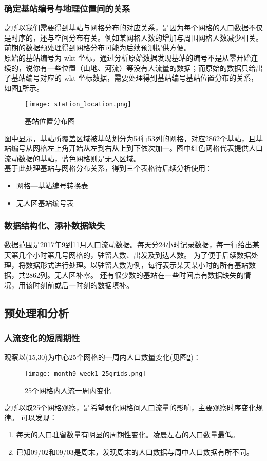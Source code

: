 \subsubsection*{确定基站编号与地理位置间的关系}
之所以我们需要得到基站与网格分布的对应关系，是因为每个网格的人口数据不仅是时序的，还与空间分布有关。例如某网格人数的增加与周围网格人数减少相关。前期的数据预处理得到网格分布可能为后续预测提供方便。\\
\indent 原始的基站编号为 wkt 坐标，通过分析原始数据发现基站的编号不是从零开始连续的，说你有一些位置（山地、河流）等没有人流量的数据；而原始的数据只给出了基站编号对应的 wkt 坐标数据，需要处理得到基站编号基站位置分布的关系，如图\ref{fig:2.1}所示。
\begin{figure}[ht]
\centering
\texttt{[image: station\_location.png]}
\caption{基站位置分布图}
\label{fig:2.1}
\end{figure}
图中显示，基站所覆盖区域被基站划分为54行53列的网格，对应2862个基站，且基站编号从网格左上角开始从左到右从上到下依次加一。图中红色网格代表提供人口流动数据的基站，蓝色网格则是无人区域。\\
\indent 基于此处理基站与网格分布关系，得到三个表格待后续分析使用：
\begin{itemize}
	---网格行列转换表
	\item 网格---基站编号转换表
	\item 无人区基站编号表
\end{itemize}
\subsubsection*{数据结构化、添补数据缺失}
数据范围是2017年9到11月人口流动数据。每天分24小时记录数据，每一行给出某天第几个小时第几号网格的，驻留人数、出发及到达人数。
为了便于后续数据处理，将数据形式进行处理。以驻留人数为例，每行表示某天某小时的所有基站数据，共2862列。无人区补零。
还有很少数的基站在一些时间点有数据缺失的情况，用该时刻前或后一时刻的数据填补。
\subsection{预处理和分析}
\subsubsection*{人流变化的短周期性}
观察以(15,30)为中心25个网格的一周内人口数量变化(见图\ref{fig:2.2})：
\begin{figure}[ht]
\centering
\texttt{[image: month9\_week1\_25grids.png]}
\caption{25个网格内人流一周内变化}
\label{fig:2.2}
\end{figure}
之所以取25个网格观察，是希望弱化网格间人口流量的影响，主要观察时序变化规律。
\indent 可以发现：
\begin{enumerate}
	\item 每天的人口驻留数量有明显的周期性变化。凌晨左右的人口数量最低。
	\item 已知09/02和09/03是周末，发现周末的人口数据与周中人口数据有所不同。
\end{enumerate}
